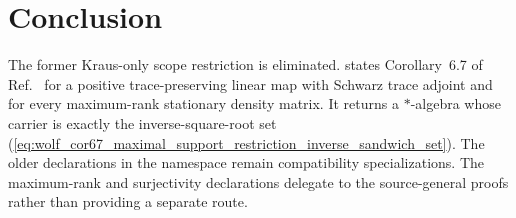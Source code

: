 \documentclass[11pt]{article}
\begin{document}
\section{Conclusion}

The former Kraus-only scope restriction is eliminated.
 states Corollary~6.7 of
Ref.~\cite{Wolf2012Quantum} for a positive trace-preserving linear map with
Schwarz trace adjoint and for every maximum-rank stationary density matrix.
It returns a $*$-algebra whose carrier is exactly the inverse-square-root set
(\ref{eq:wolf_cor67_maximal_support_restriction_inverse_sandwich_set}). The
older declarations in the  namespace remain compatibility
specializations. The maximum-rank and surjectivity declarations delegate to
the source-general proofs rather than providing a separate route.



\end{document}
